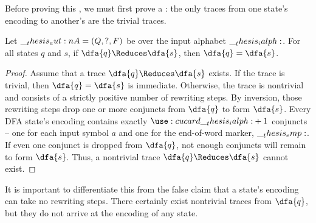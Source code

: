 Before proving this , we must first prove a : the only traces from one state's encoding to another's are the trivial traces.
%
\begin{lemma}\label{lem:ordered-rewriting:dfa-traces}
  Let $\__thesis_aut:n {A} = (Q, ?, F)$ be  over the input alphabet $\__thesis_ialph:$.
  For all states $q$ and $s$, if $\dfa{q} \Reduces \dfa{s}$, then $\dfa{q} = \dfa{s}$.
\end{lemma}
%
\begin{proof}
  Assume that a trace $\dfa{q} \Reduces \dfa{s}$ exists.
  If the trace is trivial, then $\dfa{q} = \dfa{s}$ is immediate.
  Otherwise, the trace is nontrivial and consists of a strictly positive number of rewriting steps.
  By inversion, those rewriting steps drop one or more conjuncts from $\dfa{q}$ to form $\dfa{s}$.
  Every \ac{DFA} state's encoding contains exactly $\card{\ialph} + 1$ conjuncts -- one for each input symbol $a$ and one for the end-of-word marker, $\__thesis_emp:$.
  If even one conjunct is dropped from $\dfa{q}$, not enough conjuncts will remain to form $\dfa{s}$.
  Thus, a nontrivial trace $\dfa{q} \Reduces \dfa{s}$ cannot exist.
\end{proof}
%
\noindent
It is important to differentiate this  from the false claim that a state's encoding can take no rewriting steps.
There certainly exist nontrivial traces from $\dfa{q}$, but they do not arrive at the encoding of any state.

